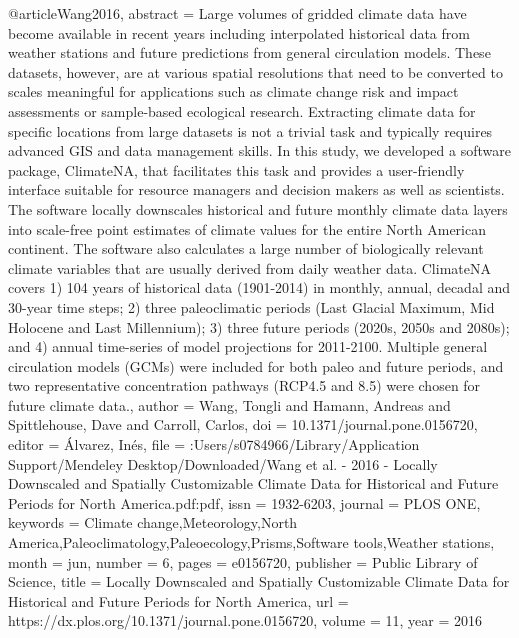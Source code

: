 @article{Wang2016,
abstract = {Large volumes of gridded climate data have become available in recent years including interpolated historical data from weather stations and future predictions from general circulation models. These datasets, however, are at various spatial resolutions that need to be converted to scales meaningful for applications such as climate change risk and impact assessments or sample-based ecological research. Extracting climate data for specific locations from large datasets is not a trivial task and typically requires advanced GIS and data management skills. In this study, we developed a software package, ClimateNA, that facilitates this task and provides a user-friendly interface suitable for resource managers and decision makers as well as scientists. The software locally downscales historical and future monthly climate data layers into scale-free point estimates of climate values for the entire North American continent. The software also calculates a large number of biologically relevant climate variables that are usually derived from daily weather data. ClimateNA covers 1) 104 years of historical data (1901-2014) in monthly, annual, decadal and 30-year time steps; 2) three paleoclimatic periods (Last Glacial Maximum, Mid Holocene and Last Millennium); 3) three future periods (2020s, 2050s and 2080s); and 4) annual time-series of model projections for 2011-2100. Multiple general circulation models (GCMs) were included for both paleo and future periods, and two representative concentration pathways (RCP4.5 and 8.5) were chosen for future climate data.},
author = {Wang, Tongli and Hamann, Andreas and Spittlehouse, Dave and Carroll, Carlos},
doi = {10.1371/journal.pone.0156720},
editor = {{\'{A}}lvarez, In{\'{e}}s},
file = {:Users/s0784966/Library/Application Support/Mendeley Desktop/Downloaded/Wang et al. - 2016 - Locally Downscaled and Spatially Customizable Climate Data for Historical and Future Periods for North America.pdf:pdf},
issn = {1932-6203},
journal = {PLOS ONE},
keywords = {Climate change,Meteorology,North America,Paleoclimatology,Paleoecology,Prisms,Software tools,Weather stations},
month = {jun},
number = {6},
pages = {e0156720},
publisher = {Public Library of Science},
title = {{Locally Downscaled and Spatially Customizable Climate Data for Historical and Future Periods for North America}},
url = {https://dx.plos.org/10.1371/journal.pone.0156720},
volume = {11},
year = {2016}
}
